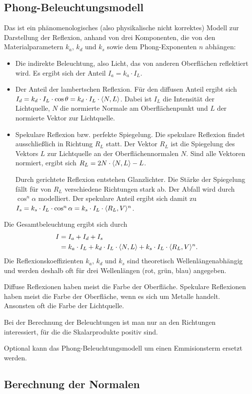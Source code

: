 \subsection{Phong-Beleuchtungsmodell}
Das  ist ein phänomenologisches (also physikalische nicht korrektes) Modell zur Darstellung der Reflexion, anhand von drei Komponenten, die von den Materialparametern $k_a$, $k_d$ und $k_s$ sowie dem Phong-Exponenten $n$ abhängen:
\begin{itemize}
	\item {}
	Die indirekte Beleuchtung, also Licht, das von anderen Oberflächen reflektiert wird.
	Es ergibt sich der Anteil $I_a = k_a \cdot I_L$.
	\item {}
	Der Anteil der lambertschen Reflexion.
	Für den diffusen Anteil ergibt sich $I_d = k_d \cdot I_L \cdot \cos \theta = k_d \cdot I_L \cdot \langle N, L \rangle$.
	Dabei ist $I_L$ die Intensität der Lichtquelle, $N$ die normierte Normale am Oberflächenpunkt und $L$ der normierte Vektor zur Lichtquelle.
	\item {}
	Spekulare Reflexion bzw. perfekte Spiegelung.
	Die spekulare Reflexion findet ausschließlich in Richtung $R_L$ statt.
	Der Vektor $R_L$ ist die Spiegelung des Vektors $L$ zur Lichtquelle an der Oberflächennormalen $N$.
	Sind alle Vektoren normiert, ergibt sich $R_L = 2N \cdot \langle N, L \rangle - L$.

	Durch gerichtete Reflexion entstehen Glanzlichter.
	Die Stärke der Spiegelung fällt für von $R_L$ verschiedene Richtungen stark ab.
	Der Abfall wird durch $\cos^n \alpha$ modelliert.
	Der spekulare Anteil ergibt sich damit zu $I_s = k_s \cdot I_L \cdot \cos^n \alpha = k_s \cdot I_L \cdot \langle R_L, V \rangle^n$.
\end{itemize}
Die Gesamtbeleuchtung ergibt sich durch
\begin{align*}
	I &= I_a + I_d + I_s \\
	  &= k_a \cdot I_L +
	  	 k_d \cdot I_L \cdot \langle N, L \rangle +
	  	 k_s \cdot I_L \cdot \langle R_L, V \rangle^n \text{.}
	\end{align*}
Die Reflexionskoeffizienten $k_a$, $k_d$ und $k_s$ sind theoretisch Wellenlängenabhängig und werden deshalb oft für drei Wellenlängen (rot, grün, blau) angegeben.

Diffuse Reflexionen haben meist die Farbe der Oberfläche.
Spekulare Reflexionen haben meist die Farbe der Oberfläche, wenn es sich um Metalle handelt.
Ansonsten oft die Farbe der Lichtquelle.

Bei der Berechnung der Beleuchtungen ist man nur an den Richtungen interessiert, für die die Skalarprodukte positiv sind.

Optional kann das Phong-Beleuchtungsmodell um einen Emmisionsterm ersetzt werden.

\subsection{Berechnung der Normalen}

